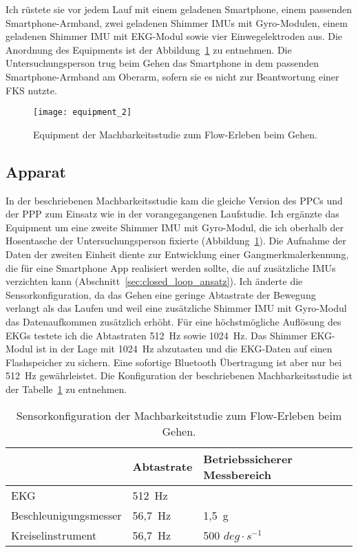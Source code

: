 Ich rüstete sie vor jedem Lauf mit einem geladenen Smartphone, einem passenden Smartphone-Armband, zwei geladenen Shimmer \acp{IMU} mit Gyro-Modulen, einem geladenen Shimmer \ac{IMU} mit \ac{EKG}-Modul sowie vier Einwegelektroden aus. Die Anordnung des Equipments ist der Abbildung~\ref{fig:equipment_2} zu entnehmen. Die Untersuchungsperson trug beim Gehen das Smartphone in dem passenden Smartphone-Armband am Oberarm, sofern sie es nicht zur Beantwortung einer \ac{FKS} nutzte. 
\begin{figure}
	[!htb] \centering 
	\texttt{[image: equipment\_2]} \caption[Equipment der Machbarkeitsstudie zum Flow-Erleben beim Gehen.]{Equipment der Machbarkeitsstudie zum Flow-Erleben beim Gehen.} \label{fig:equipment_2} 
\end{figure}

\subsection{Apparat} 

\label{sub:apparat_5_2}

In der beschriebenen Machbarkeitsstudie kam die gleiche Version des \ac{PPC}s und der \ac{PPP} zum Einsatz wie in der vorangegangenen Laufstudie. Ich ergänzte das Equipment um eine zweite Shimmer \ac{IMU} mit Gyro-Modul, die ich oberhalb der Hosentasche der Untersuchungsperson fixierte (Abbildung~\ref{fig:equipment_2}). Die Aufnahme der Daten der zweiten Einheit diente zur Entwicklung einer Gangmerkmalerkennung, die für eine Smartphone App realisiert werden sollte, die auf zusätzliche \acp{IMU} verzichten kann (Abschnitt~\ref{sec:closed_loop_ansatz}). Ich änderte die Sensorkonfiguration, da das Gehen eine geringe Abtastrate der Bewegung verlangt als das Laufen und weil eine zusätzliche Shimmer \ac{IMU} mit Gyro-Modul das Datenaufkommen zusätzlich erhöht. Für eine höchstmögliche Auflösung des \ac{EKG}s testete ich die Abtastraten 512~Hz sowie 1024~Hz. Das Shimmer \ac{EKG}-Modul ist in der Lage mit 1024~Hz abzutasten und die \ac{EKG}-Daten auf einen Flashspeicher zu sichern. Eine sofortige Bluetooth Übertragung ist aber nur bei 512~Hz gewährleistet. Die Konfiguration der beschriebenen Machbarkeitsstudie ist der Tabelle~\ref{tab:sensorkonfiguration_2} zu entnehmen. 
\begin{table}
	[!htb] \caption[Sensorkonfiguration der Machbarkeitstudie zum Flow-Erleben beim Gehen.]{Sensorkonfiguration der Machbarkeitstudie zum Flow-Erleben beim Gehen.} \label{tab:sensorkonfiguration_2} 
	\begin{tabularx}
		{ 
		\textwidth}{p{} p{} p{}} \toprule & Abtastrate & Betriebssicherer Messbereich \\
		\midrule \ac{EKG} & 512~Hz & \\
		Beschleunigungsmesser & 56,7~Hz & 1,5~g \\
		Kreiselinstrument & 56,7~Hz & 500 $deg \cdot s^{-1}$ \\
		\bottomrule 
	\end{tabularx}
\end{table}

